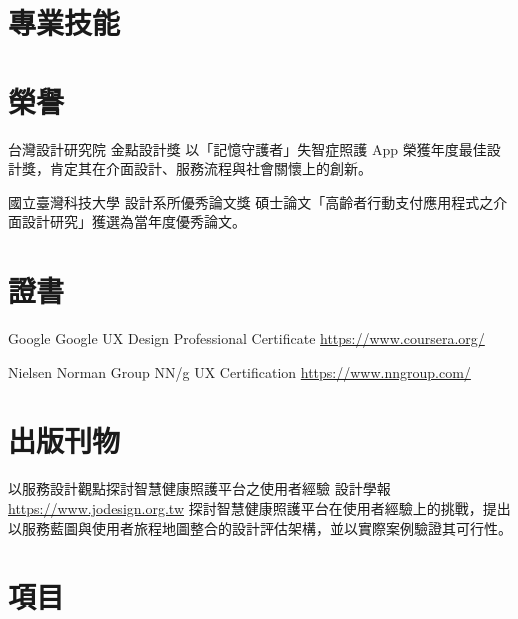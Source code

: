\documentclass[a4paper, serif, 10pt]{moderncv}
\begin{document}
\section{專業技能}

\section{榮譽}

        {台灣設計研究院}
        {金點設計獎}
        {}
        {}
        {以「記憶守護者」失智症照護 App 榮獲年度最佳設計獎，肯定其在介面設計、服務流程與社會關懷上的創新。}

        {國立臺灣科技大學}
        {設計系所優秀論文獎}
        {}
        {}
        {碩士論文「高齡者行動支付應用程式之介面設計研究」獲選為當年度優秀論文。}
\section{證書}

        {Google}
        {Google UX Design Professional Certificate}
        {\url{https://www.coursera.org/}}
        {}
        {}

        {Nielsen Norman Group}
        {NN/g UX Certification}
        {\url{https://www.nngroup.com/}}
        {}
        {}
\section{出版刊物}

        {以服務設計觀點探討智慧健康照護平台之使用者經驗}
        {設計學報}
        {\url{https://www.jodesign.org.tw}}
        {}
        {探討智慧健康照護平台在使用者經驗上的挑戰，提出以服務藍圖與使用者旅程地圖整合的設計評估架構，並以實際案例驗證其可行性。}
\section{項目}
\end{document}
